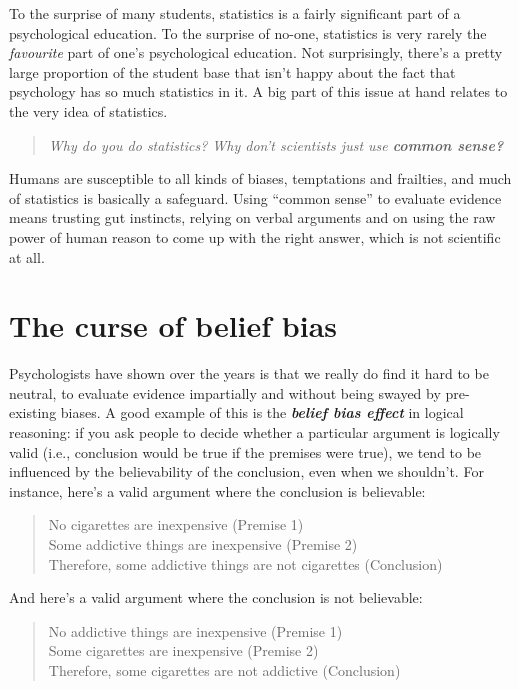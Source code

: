 \documentclass[
  11pt,
]{book}
\theoremstyle{definition}
\theoremstyle{definition}
\theoremstyle{definition}
\theoremstyle{definition}
\theoremstyle{remark}
\begin{document}
To the surprise of many students, statistics is a fairly significant part of a psychological education. To the surprise of no-one, statistics is very rarely the \emph{favourite} part of one's psychological education. Not surprisingly, there's a pretty large proportion of the student base that isn't happy about the fact that psychology has so much statistics in it. A big part of this issue at hand relates to the very idea of statistics.

\begin{quote}
\emph{Why do you do statistics? Why don't scientists just use \textbf{common sense?}}
\end{quote}

Humans are susceptible to all kinds of biases, temptations and frailties, and much of statistics is basically a safeguard. Using ``common sense'' to evaluate evidence means trusting gut instincts, relying on verbal arguments and on using the raw power of human reason to come up with the right answer, which is not scientific at all.

\hypertarget{the-curse-of-belief-bias}{%
\section{The curse of belief bias}\label{the-curse-of-belief-bias}}

Psychologists have shown over the years is that we really do find it hard to be neutral, to evaluate evidence impartially and without being swayed by pre-existing biases. A good example of this is the \textbf{\emph{belief bias effect}} in logical reasoning: if you ask people to decide whether a particular argument is logically valid (i.e., conclusion would be true if the premises were true), we tend to be influenced by the believability of the conclusion, even when we shouldn't. For instance, here's a valid argument where the conclusion is believable:

\begin{quote}
No cigarettes are inexpensive (Premise 1)\\
Some addictive things are inexpensive (Premise 2)\\
Therefore, some addictive things are not cigarettes (Conclusion)
\end{quote}

And here's a valid argument where the conclusion is not believable:

\begin{quote}
No addictive things are inexpensive (Premise 1)\\
Some cigarettes are inexpensive (Premise 2)\\
Therefore, some cigarettes are not addictive (Conclusion)
\end{quote}
\end{document}

